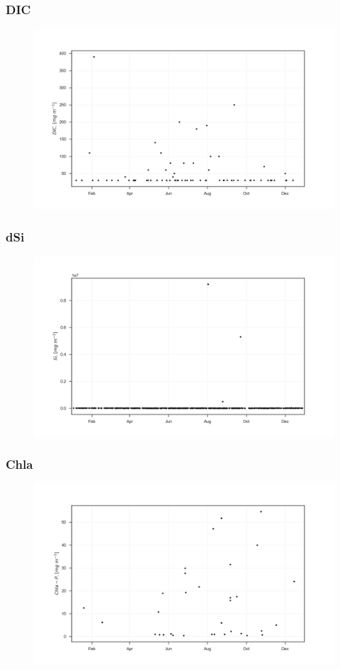 \documentclass{beamer}
\begin{document}
\begin{frame}
\frametitle{DIC}
\begin{figure}
\includegraphics[width=\textwidth]{rivers/all/1yr_graph/DIC.png}
\end{figure}
\end{frame}

\begin{frame}
\frametitle{dSi}
\begin{figure}
\includegraphics[width=\textwidth]{rivers/all/1yr_graph/dSi.png}
\end{figure}
\end{frame}

\begin{frame}
\frametitle{Chla}
\begin{figure}
\includegraphics[width=\textwidth]{rivers/all/1yr_graph/Chla.png}
\end{figure}
\end{frame}
\end{document}
